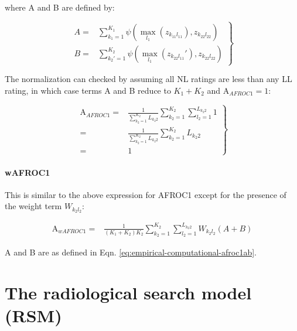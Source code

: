 \documentclass[
]{book}
\begin{document}
where A and B are defined by:

\begin{equation}
\left. 
\begin{aligned}
A =& \sum_{k_1=1}^{K_1}\psi\left ( \max_{l_1}\left (z_{k_11l_11}  \right ),z_{k_22l_22} \right ) \\
B =& \sum_{k_2'=1}^{K_2}\psi\left ( \max_{l_1}\left (z_{k_22l_11}'  \right ),z_{k_22l_22} \right )
\end{aligned}
\right \} 
\label{eq:empirical-computational-afroc1ab}
\end{equation}

The normalization can checked by assuming all NL ratings are less than any LL rating, in which case terms A and B reduce to \(K_1+K_2\) and \(\text{A}_{AFROC1} = 1\):

\begin{equation}
\left. 
\begin{aligned}
\text{A}_{AFROC1} =& \frac{1}{\sum_{k_2=1}^{K_2}L_{k_2 2}}\sum_{k_2=1}^{K_2}\sum_{l_2=1}^{L_{k_2 2}} 1 \\
=& \frac{1}{\sum_{k_2=1}^{K_2}L_{k_2 2}}\sum_{k_2=1}^{K_2}L_{k_2 2} \\
=& 1
\end{aligned}
\right \} 
\label{eq:empirical-computational-afroc1a}
\end{equation}

\hypertarget{wafroc1}{%
\subsection{wAFROC1}\label{wafroc1}}

This is similar to the above expression for AFROC1 except for the presence of the weight term \(W_{k_2l_2}\):

\begin{equation}
\begin{aligned}
\text{A}_{wAFROC1} =& \frac{1}{\left (K_1 + K_2 \right )K_2}\sum_{k_2=1}^{K_2}\sum_{l_2=1}^{L_{k_2 2}} W_{k_2l_2}\left( A+B \right)
\end{aligned}
\label{eq:empirical-computational-wafroc1}
\end{equation}

A and B are as defined in Eqn. \eqref{eq:empirical-computational-afroc1ab}.

\hypertarget{part-the-radiological-search-model-rsm}{%
\part*{The radiological search model (RSM)}\label{part-the-radiological-search-model-rsm}}
\end{document}
